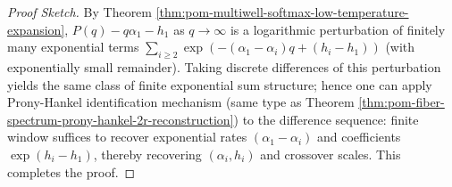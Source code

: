 \begin{proof}[Proof Sketch]
By Theorem \ref{thm:pom-multiwell-softmax-low-temperature-expansion},
\(
P(q)-q\alpha_1-h_1
\)
as \(q\to\infty\) is a logarithmic perturbation of finitely many exponential terms
\(\sum_{i\ge2}\exp(-(\alpha_1-\alpha_i)q+(h_i-h_1))\)
(with exponentially small remainder).
Taking discrete differences of this perturbation yields the same class of finite exponential sum structure;
hence one can apply Prony-Hankel identification mechanism (same type as Theorem \ref{thm:pom-fiber-spectrum-prony-hankel-2r-reconstruction}) to the difference sequence:
finite window suffices to recover exponential rates \((\alpha_1-\alpha_i)\) and coefficients \(\exp(h_i-h_1)\), thereby recovering \((\alpha_i,h_i)\) and crossover scales.
This completes the proof.
\end{proof}


